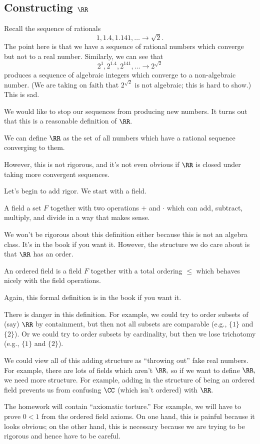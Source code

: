 \documentclass[../notes.tex]{subfiles}
\begin{document}
\subsection{Constructing \texorpdfstring{$\RR$}{}}
Recall the sequence of rationals
\[1,1.4,1.141,\ldots\to\sqrt2.\]
The point here is that we have a sequence of rational numbers which converge but not to a real number. Similarly, we can see that
\[2^1,2^{1.4},2^{141},\ldots\to2^{\sqrt2}\]
produces a sequence of algebraic integers which converge to a non-algebraic number. (We are taking on faith that $2^{\sqrt2}$ is not algebraic; this is hard to show.) This is sad.

We would like to stop our sequences from producing new numbers. It turns out that this is a reasonable definition of $\RR.$
\begin{defi}[Reals, I] \label{defi:real1}
	We can define $\RR$ as the set of all numbers which have a rational sequence converging to them.
\end{defi}
However, this is not rigorous, and it's not even obvious if $\RR$ is closed under taking more convergent sequences.

Let's begin to add rigor. We start with a field.
\begin{defi}[Field]
	A field a set $F$ together with two operations $+$ and $\cdot$ which can add, subtract, multiply, and divide in a way that makes sense.
\end{defi}
We won't be rigorous about this definition either because this is not an algebra class. It's in the book if you want it. However, the structure we do care about is that $\RR$ has an order.
\begin{defi}
	An ordered field is a field $F$ together with a total ordering $\le$ which behaves nicely with the field operations.
\end{defi}
Again, this formal definition is in the book if you want it.
\begin{warn}
	There is danger in this definition. For example, we could try to order subsets of (say) $\RR$ by containment, but then not all subsets are comparable (e.g., $\{1\}$ and $\{2\}$). Or we could try to order subsets by cardinality, but then we lose trichotomy (e.g., $\{1\}$ and $\{2\}$).
\end{warn}
\begin{remark}
	We could view all of this adding structure as ``throwing out'' fake real numbers. For example, there are lots of fields which aren't $\RR,$ so if we want to define $\RR,$ we need more structure. For example, adding in the structure of being an ordered field prevents us from confusing $\CC$ (which isn't ordered) with $\RR.$
\end{remark}
\begin{remark}
	The homework will contain ``axiomatic torture.'' For example, we will have to prove $0<1$ from the ordered field axioms. On one hand, this is painful because it looks obvious; on the other hand, this is necessary because we are trying to be rigorous and hence have to be careful.
\end{remark}
\end{document}
